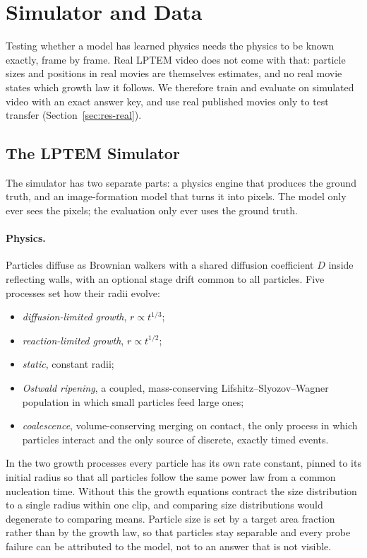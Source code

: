 \section{Simulator and Data}
\label{sec:data}

Testing whether a model has learned physics needs the physics to be known exactly, frame
by frame. Real LPTEM video does not come with that: particle sizes and positions in real
movies are themselves estimates, and no real movie states which growth law it follows.
We therefore train and evaluate on simulated video with an exact answer key, and use real
published movies only to test transfer (Section~\ref{sec:res-real}).

\subsection{The LPTEM Simulator}
\label{sec:simulator}

The simulator has two separate parts: a physics engine that produces the ground truth,
and an image-formation model that turns it into pixels. The model only ever sees the
pixels; the evaluation only ever uses the ground truth.

\paragraph{Physics.} Particles diffuse as Brownian walkers with a shared diffusion
coefficient $D$ inside reflecting walls, with an optional stage drift common to all
particles. Five processes set how their radii evolve:
\begin{itemize}
  \item \emph{diffusion-limited growth}, $r \propto t^{1/3}$;
  \item \emph{reaction-limited growth}, $r \propto t^{1/2}$;
  \item \emph{static}, constant radii;
  \item \emph{Ostwald ripening}, a coupled, mass-conserving Lifshitz--Slyozov--Wagner
    population in which small particles feed large ones;
  \item \emph{coalescence}, volume-conserving merging on contact, the only process in
    which particles interact and the only source of discrete, exactly timed events.
\end{itemize}
In the two growth processes every particle has its own rate constant, pinned to its
initial radius so that all particles follow the same power law from a common nucleation
time. Without this the growth equations contract the size distribution to a single
radius within one clip, and comparing size distributions would degenerate to comparing
means. Particle size is set by a target area fraction rather than by the growth law, so
that particles stay separable and every probe failure can be attributed to the model,
not to an answer that is not visible.

